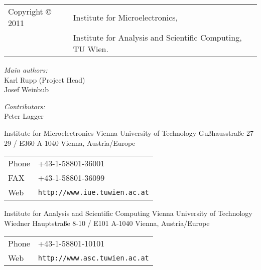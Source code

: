 
\clearpage

\begin{tabular}{ll}
Copyright {\copyright} 2011 & Institute for Microelectronics, \\
                            & Institute for Analysis and Scientific Computing, TU Wien.
\end{tabular}

\vspace{4cm}

\textit{Main authors:}\\ 

Karl Rupp (Project Head)\\
Josef Weinbub \\

\vspace{1cm}

\textit{Contributors:}\\ 

Peter Lagger


\vspace{4.0cm}

Institute for Microelectronics\newline
Vienna University of Technology\newline
Gu\ss hausstra\ss e 27-29 / E360\newline
A-1040 Vienna, Austria/Europe\newline

\begin{tabular}{ll}
Phone  & +43-1-58801-36001\\
FAX    & +43-1-58801-36099\\
Web    & \texttt{http://www.iue.tuwien.ac.at}
\end{tabular}

\vspace{1.5cm}

Institute for Analysis and Scientific Computing\newline
Vienna University of Technology\newline
Wiedner Hauptstra\ss e 8-10 / E101\newline
A-1040 Vienna, Austria/Europe\newline

\begin{tabular}{ll}
Phone  & +43-1-58801-10101\\
Web    & \texttt{http://www.asc.tuwien.ac.at}
\end{tabular}




